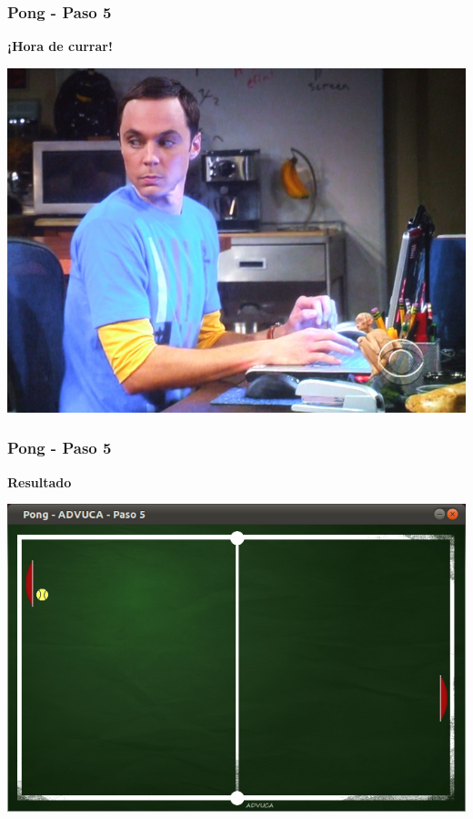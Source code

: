 \begin{frame}
	\frametitle{Pong - Paso 5}
	
    \begin{center}
        \textbf{¡Hora de currar!}
    \end{center}
	
    \begin{center}
		\includegraphics[scale=0.3]{img/currar-5.jpg}
	\end{center}	

\end{frame}

\begin{frame}
	\frametitle{Pong - Paso 5}
	
    \begin{center}
        \textbf{Resultado}
    \end{center}
	
    \begin{center}
		\includegraphics[scale=0.4]{img/pong-advuca-5.png}
	\end{center}	

\end{frame}

